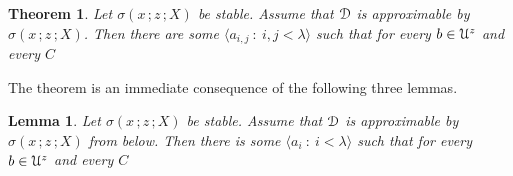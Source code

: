 \documentclass{amsproc}
\makeatletter
\newcommand{\mylabel}[1]{{#1}\hfill}
\renewenvironment{itemize}
  {\begin{list}{$\triangleright$}{%
  \setlength{\parskip}{0mm}
  \setlength{\topsep}{.1\baselineskip}
  \setlength{\rightmargin}{0mm}
  \setlength{\listparindent}{0mm}
  \setlength{\itemindent}{0mm}
  \setlength{\labelwidth}{3ex}
  \setlength{\itemsep}{.1\baselineskip}
  \setlength{\parsep}{.1\baselineskip}
  \setlength{\partopsep}{0mm}
  \setlength{\labelsep}{1ex}
  \setlength{\leftmargin}{\labelwidth+\labelsep}
  \let\makelabel\mylabel}}{%
\end{list}}
\newcounter{thm}
\theoremstyle{mio}
\newtheorem{theorem}[thm]{Theorem}\tcolorboxenvironment{theorem}{mythm}
\newtheorem{lemma}[thm]{Lemma}\tcolorboxenvironment{lemma}{mythm}
\newtheorem{fact}[thm]{Fact}\tcolorboxenvironment{fact}{mythm}
\providecommand{\proofNameStyle}{\bfseries}
\renewenvironment{proof}[1][\proofname]{\par
  \pushQED{\qed}%
  \normalfont%
  \trivlist
  \item[\hskip\labelsep
        \proofNameStyle
    #1\@addpunct{.}]\ignorespaces
}{%
  \popQED\endtrivlist\@endpefalse
}
\makeatother
\begin{document}



    




\begin{theorem}\label{thm_stability_definability}
  Let $\sigma(x\,;z\,;X)$ be stable.
  Assume that ${\EuScript D}$ is approximable by $\sigma(x\,;z\,;X)$.
  Then there are some $\langle a_{i,j}\ :\ i,j<\lambda\rangle$ such that for every $b\in{\EuScript U}^z$ and every $C$\medskip

  \medskip

\end{theorem}

\begin{proof}
  The theorem is an immediate consequence of the following three lemmas.
\end{proof}

\begin{lemma}\label{lem_1_inf}
  Let $\sigma(x\,;z\,;X)$ be stable.
  Assume that ${\EuScript D}$ is approximable by $\sigma(x\,;z\,;X)$ from below.
  Then there is some $\langle a_i\ :\ i<\lambda\rangle$ such that for every $b\in{\EuScript U}^z$ and every $C$\medskip

  \medskip 

\end{lemma}
\end{document}

